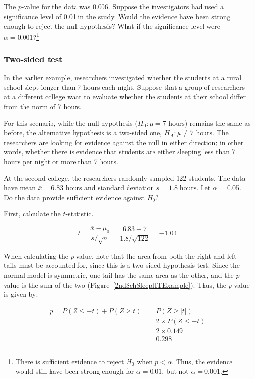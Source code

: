 \begin{spacing}{1.5}
\begin{exercise}
The $p$-value for the data was 0.006. Suppose the investigators had used a significance level of 0.01 in the study. Would the evidence have been strong enough to reject the null hypothesis? What if the significance level were $\alpha = 0.001$?\footnote{There is sufficient evidence to reject $H_{0}$ when $p < \alpha$. Thus, the evidence would still have been strong enough for $\alpha = 0.01$, but not $\alpha = 0.001$.}
\end{exercise}

\subsubsection{Two-sided test}

In the earlier example, researchers investigated whether the students at a rural school slept longer than 7 hours each night. Suppose that a group of researchers at a different college want to evaluate whether the students at their school differ from the norm of 7 hours. 

For this scenario, while the null hypothesis ($H_0: \mu = 7 \text{ hours}$) remains the same as before, the alternative hypothesis is a two-sided one, $H_A: \mu \neq 7\text{ hours}$. The researchers are looking for evidence against the null in either direction; in other words, whether there is evidence that students are either sleeping less than 7 hours per night or more than 7 hours. 

\begin{example}{At the second college, the researchers randomly sampled 122 students. The data have mean $\overline{x} = 6.83 \text{ hours}$ and standard deviation $s = 1.8 \text{ hours}$. Let $\alpha$ = 0.05. Do the data provide sufficient evidence against $H_0$?} 
	
	First, calculate the $t$-statistic. 
	
	\[t=\frac{\overline{x}-\mu_0}{s/\sqrt{n}} = \frac{6.83 - 7}{1.8 / \sqrt{122}} = -1.04\]
	
	When calculating the $p$-value, note that the area from both the right and left tails must be accounted for, since this is a two-sided hypothesis test. Since the normal model is symmetric, one tail has the same area as the other, and the $p$-value is the sum of the two (Figure~\ref{2ndSchSleepHTExample}). Thus, the $p$-value is given by:
	
	\begin{align*}
	p = P(Z \leq -t) + P(Z \geq t) &= P(Z \geq |t|) \\
		&= 2 \times P(Z \leq -t) \\
		&= 2 \times 0.149 \\
		&= 0.298
	\end{align*}


\end{example}
\end{spacing}
